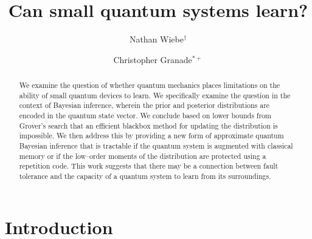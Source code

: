 \documentclass[aps,amsmath,onecolumn,amssymb,notitlepage]{revtex4-1}
\begin{document}
\newcommand{\id}{\openone}


\title{Can small quantum systems learn?}
\author{Nathan Wiebe$^\dagger$}
\author{Christopher Granade$^{*+}$}
\begin{abstract}
We examine the question of whether quantum mechanics places limitations on the ability of small quantum devices to learn.  We specifically examine the question in the context of Bayesian inference, wherein the prior and posterior distributions are encoded in the quantum state vector.  We conclude based on lower bounds from Grover's search that an efficient blackbox method for updating the distribution is impossible.  We then address this by providing a new form of approximate quantum Bayesian inference that is tractable if the quantum system is augmented with classical memory or if the low--order moments of the distribution are protected using a repetition code.  This work suggests that there may be a connection between fault tolerance and the capacity of a quantum system to learn from its surroundings.
\end{abstract}
\maketitle
\section{Introduction}
\end{document}
